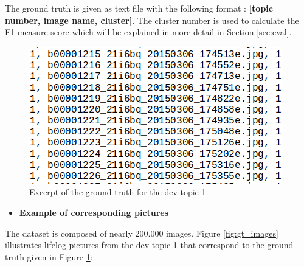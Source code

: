     The ground truth is given as text file with the following format : \textbf{[topic number, image name, cluster]}.
    The cluster number is used to calculate the F1-measure score which will be explained in more detail in Section \ref{sec:eval}.


    \begin{figure}[htb]
        
        \centering
        \captionsetup{justification=centering}
        \includegraphics[scale = 0.55]{Sections/5ImageClef/images/gt_t1.png}
        \caption[Ground truth excerpt]{Excerpt of the ground truth for the dev topic 1.}  
        \label{fig:gt}
    \end{figure}

    \begin{itemize}
        \item    \textbf{Example of corresponding pictures}
    \end{itemize}
 

    The dataset is composed of nearly 200.000 images. Figure \ref{fig:gt_images} illustrates lifelog pictures from the dev topic 1 that correspond to the ground truth given in Figure \ref{fig:gt}:


